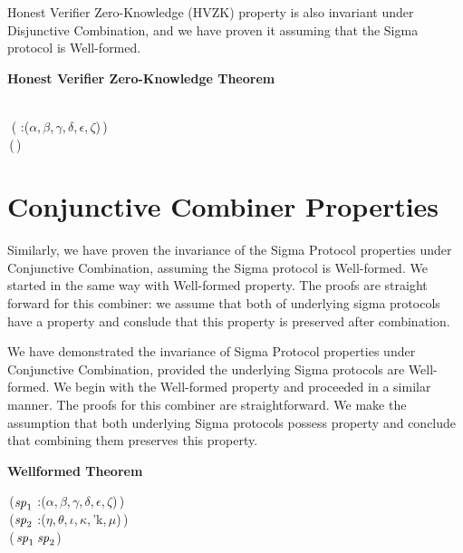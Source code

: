 Honest Verifier Zero-Knowledge (HVZK) property is also invariant under Disjunctive Combination, and we have proven it assuming that the Sigma protocol is Well-formed.

\textbf{Honest Verifier Zero-Knowledge Theorem}
\begin{holmath}
    \\
\,\,( :(\ensuremath{\alpha},\,\ensuremath{\beta},\,\ensuremath{\gamma},\,\ensuremath{\delta},\,\ensuremath{\epsilon},\,\ensuremath{\zeta})\,)\,\HOLSymConst{\HOLTokenConj{}}\,\,\,\HOLSymConst{\HOLTokenImp{}}\\
\,(\,)
\end{holmath}  

\newpage
\section{Conjunctive Combiner Properties}
Similarly, we have proven the invariance of the Sigma Protocol properties under Conjunctive Combination, assuming the Sigma protocol is Well-formed. We started in the same way with Well-formed property. 
The proofs are straight forward for this combiner: we assume that both of underlying sigma protocols have a property and conslude that this property is preserved after combination. 

We have demonstrated the invariance of Sigma Protocol properties under Conjunctive Combination, provided the underlying Sigma protocols are Well-formed. We begin with the Well-formed property and proceeded in a similar manner.
The proofs for this combiner are straightforward. We make the assumption that both underlying Sigma protocols possess property and conclude that combining them preserves this property.

\textbf{Wellformed Theorem}
\begin{holmath}
    \,(\ensuremath{\HOLFreeVar{sp}\sb{\mathrm{1}}} :(\ensuremath{\alpha},\,\ensuremath{\beta},\,\ensuremath{\gamma},\,\ensuremath{\delta},\,\ensuremath{\epsilon},\,\ensuremath{\zeta})\,)\,\HOLSymConst{\HOLTokenConj{}}\\
\,(\ensuremath{\HOLFreeVar{sp}\sb{\mathrm{2}}} :(\ensuremath{\eta},\,\ensuremath{\theta},\,\ensuremath{\iota},\,\ensuremath{\kappa},\,'k,\,\ensuremath{\mu})\,)\,\HOLSymConst{\HOLTokenImp{}}\\
\,(\,\ensuremath{\HOLFreeVar{sp}\sb{\mathrm{1}}}\,\ensuremath{\HOLFreeVar{sp}\sb{\mathrm{2}}})
\end{holmath}  


